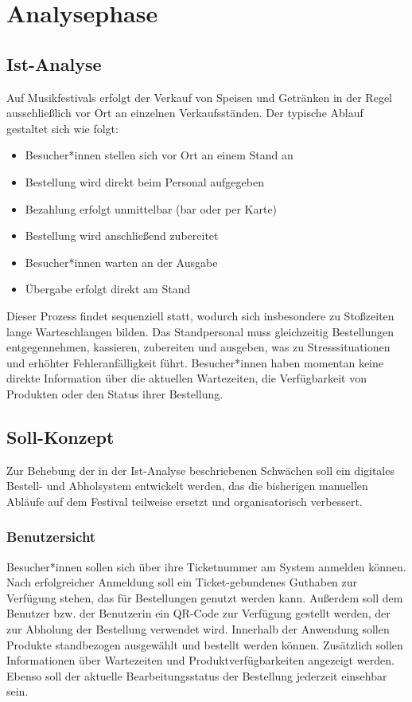 
\section{Analysephase} 
\label{sec:Analysephase}

\subsection{Ist-Analyse} 
\label{sec:IstAnalyse}
Auf Musikfestivals erfolgt der Verkauf von Speisen und Getränken in der Regel ausschließlich vor Ort an einzelnen Verkaufsständen. 
Der typische Ablauf gestaltet sich wie folgt:

\begin{itemize}
    \item Besucher*innen stellen sich vor Ort an einem Stand an
    \item Bestellung wird direkt beim Personal aufgegeben
    \item Bezahlung erfolgt unmittelbar (bar oder per Karte)
    \item Bestellung wird anschließend zubereitet
    \item Besucher*innen warten an der Ausgabe
    \item Übergabe erfolgt direkt am Stand
\end{itemize}

Dieser Prozess findet sequenziell statt, wodurch sich insbesondere zu Stoßzeiten lange Warteschlangen bilden. Das Standpersonal muss 
gleichzeitig Bestellungen entgegennehmen, kassieren, zubereiten und ausgeben, was zu Stresssituationen und erhöhter Fehleranfälligkeit führt.
Besucher*innen haben momentan keine direkte Information über die aktuellen Wartezeiten, die Verfügbarkeit von Produkten oder den Status 
ihrer Bestellung.

\subsection{Soll-Konzept}
\label{sec:SollKonzept}
Zur Behebung der in der Ist-Analyse beschriebenen Schwächen soll ein digitales Bestell- und Abholsystem entwickelt werden, das die bisherigen
manuellen Abläufe auf dem Festival teilweise ersetzt und organisatorisch verbessert.

\subsubsection{Benutzersicht}
Besucher*innen sollen sich über ihre Ticketnummer am System anmelden können. Nach erfolgreicher Anmeldung soll ein Ticket-gebundenes Guthaben
zur Verfügung stehen, das für Bestellungen genutzt werden kann. Außerdem soll dem Benutzer bzw. der Benutzerin ein \acs{QR}-Code zur Verfügung gestellt werden,
der zur Abholung der Bestellung verwendet wird. Innerhalb der Anwendung sollen Produkte standbezogen ausgewählt und bestellt werden können.
Zusätzlich sollen Informationen über Wartezeiten und Produktverfügbarkeiten angezeigt werden. Ebenso soll der aktuelle Bearbeitungsstatus der Bestellung
jederzeit einsehbar sein.

